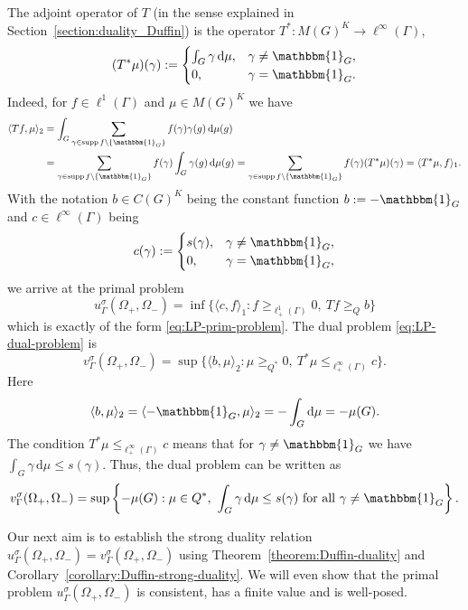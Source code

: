 \documentclass[[a4paper,english,12pt]{amsart}
\theoremstyle{plain}
\theoremstyle{remark}
\newcommand\supp{\operatorname{supp}}
\begin{document}
The adjoint operator of $T$ (in the sense explained in Section~\ref{section:duality_Duffin}) is the operator $T^* : M(G)^K \to \ell^\infty(\Gamma)$,
$$
(T^* \mu)(\gamma) :=
\begin{cases}
\int_{G} \gamma \, \mbox{d}\mu , & \gamma \ne \mathbbm{1}_G, \\
0, & \gamma = \mathbbm{1}_G.
\end{cases}
$$
Indeed, for $f \in \ell^1(\Gamma)$ and $\mu \in M(G)^{K}$ we have
\begin{align*}
\langle Tf, \mu \rangle_2
& = \int_{G} \sum_{\gamma \in  \supp{f} \setminus \{\mathbbm{1}_G\}} f(\gamma) \gamma(g) \, \mbox{d}\mu(g) \\
& = \sum_{\gamma \in  \supp{f} \setminus \{\mathbbm{1}_G\}} f(\gamma) \int_{G} \gamma(g) \, \mbox{d}\mu(g)
= \sum_{\gamma \in  \supp{f} \setminus \{\mathbbm{1}_G\}} f(\gamma)  (T^* \mu)(\gamma)
= \langle T^* \mu, f \rangle_1.
\end{align*}
With the notation $b \in C(G)^K$ being the constant function $b := -\mathbbm{1}_G$ and $c \in \ell^\infty(\Gamma)$ being
$$
c(\gamma) :=
\begin{cases}
s(\gamma), & \gamma \ne \mathbbm{1}_G, \\
0, & \gamma = \mathbbm{1}_G, 
\end{cases}
$$
we arrive at the primal problem 
$$
u_\Gamma^{\sigma}(\Omega_+, \Omega_-) = \inf \{ \langle c, f \rangle_1 : f \ge_{\ell^1_+(\Gamma)} 0, \ Tf \ge_{Q} b \}
$$
which is exactly of the form \eqref{eq:LP-prim-problem}.
The dual problem \eqref{eq:LP-dual-problem} is
$$
v_\Gamma^{\sigma}(\Omega_+, \Omega_-) = \sup \{ \langle b, \mu \rangle_2 : \mu \ge_{Q^*} 0, \ T^* \mu \le_{\ell^\infty_+(\Gamma)} c\}.
$$
Here
$$
\langle b, \mu \rangle_2 = \langle -\mathbbm{1}_{G}, \mu \rangle_2 = -\int_{G} \mbox{d}\mu = - \mu(G).
$$
The condition $T^* \mu \le_{\ell^\infty_+(\Gamma)} c$ means that for $\gamma \ne \mathbbm{1}_{G}$ we have $\int_G \gamma \,\mbox{d}\mu \le s(\gamma)$. Thus, the dual problem can be written as
$$
v_\Gamma^{\sigma}(\Omega_+, \Omega_-) = \sup \left\{ -\mu(G) : \mu \in Q^*, \ \int_G \gamma \,\mbox{d}\mu \le s(\gamma) \text{ for all } \gamma \ne \mathbbm{1}_G\right\}.
$$

Our next aim is to establish the strong duality relation $u_\Gamma^{\sigma}(\Omega_+, \Omega_-) = v_\Gamma^{\sigma}(\Omega_+, \Omega_-)$ using Theorem~\ref{theorem:Duffin-duality} and Corollary~\ref{corollary:Duffin-strong-duality}. We will even show that the primal problem
$u_\Gamma^{\sigma}(\Omega_+, \Omega_-)$ is consistent, has a finite value and is well-posed. 
\end{document}
